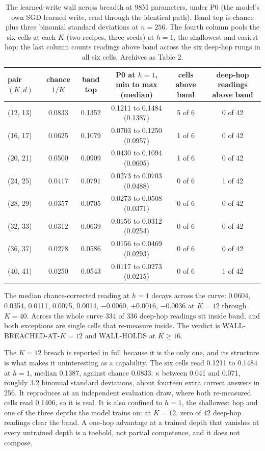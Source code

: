 \begin{table}[t]
\centering
\caption{The learned-write wall across breadth at 98M parameters, under P0 (the model's own SGD-learned write, read through the identical path). Band top is chance plus three binomial standard deviations at $n{=}256$. The fourth column pools the six cells at each $K$ (two recipes, three seeds) at $h{=}1$, the shallowest and easiest hop; the last column counts readings above band across the six deep-hop rungs in all six cells. Archives as Table 2.}
\label{tab:breadth-wall}
\small
\begin{tabular}{lccccc}
\toprule
pair $(K, d)$ & chance $1/K$ & band top & P0 at $h{=}1$, min to max (median) & cells above band & deep-hop readings above band \\
\midrule
(12, 13) & 0.0833 & 0.1352 & 0.1211 to 0.1484 (0.1387) & 5 of 6 & 0 of 42 \\
(16, 17) & 0.0625 & 0.1079 & 0.0703 to 0.1250 (0.0957) & 1 of 6 & 0 of 42 \\
(20, 21) & 0.0500 & 0.0909 & 0.0430 to 0.1094 (0.0605) & 1 of 6 & 0 of 42 \\
(24, 25) & 0.0417 & 0.0791 & 0.0273 to 0.0703 (0.0488) & 0 of 6 & 1 of 42 \\
(28, 29) & 0.0357 & 0.0705 & 0.0273 to 0.0508 (0.0371) & 0 of 6 & 0 of 42 \\
(32, 33) & 0.0312 & 0.0639 & 0.0156 to 0.0312 (0.0254) & 0 of 6 & 0 of 42 \\
(36, 37) & 0.0278 & 0.0586 & 0.0156 to 0.0469 (0.0293) & 0 of 6 & 0 of 42 \\
(40, 41) & 0.0250 & 0.0543 & 0.0117 to 0.0273 (0.0215) & 0 of 6 & 1 of 42 \\
\bottomrule
\end{tabular}
\end{table}

The median chance-corrected reading at $h{=}1$ decays across the curve:
0.0604, 0.0354, 0.0111, 0.0075, 0.0014, $-0.0060$, $+0.0016$, $-0.0036$
at $K{=}12$ through $K{=}40$. Across the whole curve 334 of 336
deep-hop readings sit inside band, and both exceptions are single cells
that re-measure inside. The verdict is WALL-BREACHED-AT-$K{=}12$ and
WALL-HOLDS at $K \geq 16$.

The $K{=}12$ breach is reported in full because it is the only one, and
its structure is what makes it uninteresting as a capability. The six
cells read 0.1211 to 0.1484 at $h{=}1$, median 0.1387, against chance
0.0833: $\kappa$ between 0.041 and 0.071, roughly 3.2 binomial standard
deviations, about fourteen extra correct answers in 256. It reproduces
at an independent evaluation draw, where both re-measured cells read
0.1406, so it is real. It is also confined to $h{=}1$, the shallowest
hop and one of the three depths the model trains on: at $K{=}12$, zero
of 42 deep-hop readings clear the band. A one-hop advantage at a trained
depth that vanishes at every untrained depth is a toehold, not partial
competence, and it does not compose.

